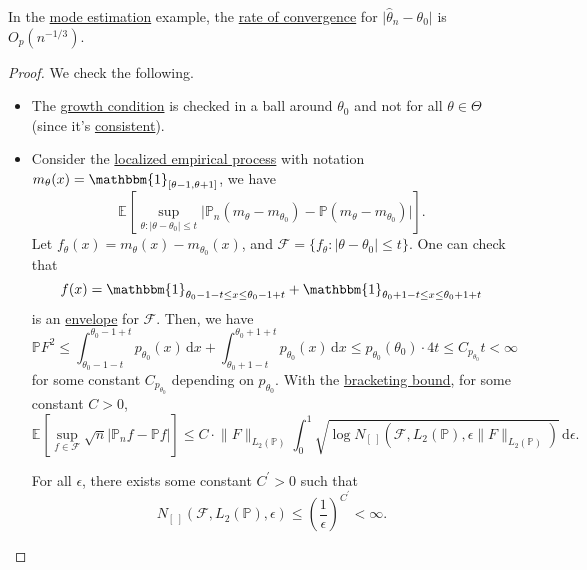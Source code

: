 \begin{proposition}
	In the \hyperref[eg:mode-estimation]{mode estimation} example, the \hyperref[def:rate-of-convergence]{rate of convergence} for \(\vert \hat{\theta} _n - \theta _0 \vert \) is \(O_p(n^{-1 / 3})\).
\end{proposition}
\begin{proof}
	We check the following.
	\begin{itemize}
		\item The \hyperref[def:growth-condition*]{growth condition} is checked in a ball around \(\theta _0\) and not for all \(\theta \in \Theta \) (since it's \hyperref[def:consistent]{consistent}).
		\item Consider the \hyperref[def:localized-EP]{localized empirical process} with notation \(m_\theta (x) = \mathbbm{1}_{[\theta -1, \theta +1]} \), we have
		      \[
			      \mathbb{E}_{}\left[\sup _{\theta \colon \vert \theta - \theta _0 \vert \leq t} \vert \mathbb{P} _n(m_\theta - m_{\theta _0}) - \mathbb{P} (m_\theta - m_{\theta _0}) \vert \right].
		      \]
		      Let \(f_\theta (x) = m_\theta (x) - m_{\theta _0}(x)\), and \(\mathscr{F} = \{ f_\theta \colon \vert \theta -\theta _0 \vert \leq t \} \). One can check that
		      \[
			      f(x) = \mathbbm{1}_{\theta _0 - 1 - t \leq x \leq \theta _0 - 1 + t} + \mathbbm{1}_{\theta _0 + 1 - t \leq x \leq \theta _0 + 1 + t}
		      \]
		      is an \hyperref[def:envelope]{envelope} for \(\mathscr{F} \). Then, we have
		      \[
			      \mathbb{P} F^2
			      \leq \int_{\theta _0 - 1 - t}^{\theta _0 - 1 + t} p_{\theta _0}(x) \,\mathrm{d}x + \int_{\theta _0 + 1 - t}^{\theta _0 + 1 + t} p_{\theta _0}(x)  \,\mathrm{d}x
			      \leq p_{\theta _0}(\theta _0) \cdot 4t
			      \leq C_{p_{\theta _0}} t
			      < \infty
		      \]
		      for some constant \(C_{p_{\theta _0}}\) depending on \(p_{\theta _0}\). With the \hyperref[thm:bracketing-bound]{bracketing bound}, for some constant \(C > 0\),
		      \[
			      \mathbb{E}_{}\left[\sup _{f\in \mathscr{F} } \sqrt{n} \vert \mathbb{P} _n f - \mathbb{P} f \vert \right]
			      \leq C\cdot \lVert F \rVert _{L_2(\mathbb{P} )} \int_{0}^{1} \sqrt{\log N_{[\ ]}(\mathscr{F} , L_2(\mathbb{P} ), \epsilon \lVert F \rVert _{L_2(\mathbb{P} )})} \,\mathrm{d}\epsilon .
		      \]
		      \begin{claim}
			      For all \(\epsilon\), there exists some constant \(C^{\prime} > 0\) such that
			      \[
				      N_{[\ ]}(\mathscr{F} , L_2(\mathbb{P} ), \epsilon )
				      \leq \left( \frac{1}{\epsilon } \right) ^{C^{\prime} } < \infty .
\]
\end{claim}
\end{itemize}
\end{proof}
